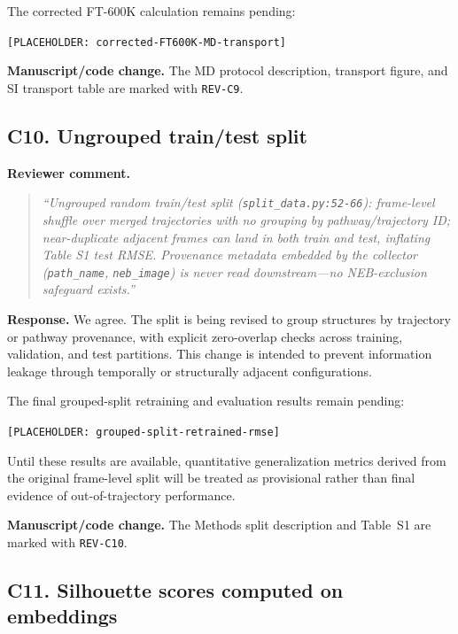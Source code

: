 \documentclass[11pt,a4paper]{article}
\begin{document}
The corrected FT-600K calculation remains pending:

\begin{center}
\texttt{[PLACEHOLDER: corrected-FT600K-MD-transport]}
\end{center}

\noindent\textbf{Manuscript/code change.}
The MD protocol description, transport figure, and SI transport table are marked with \texttt{REV-C9}.

\subsection*{C10. Ungrouped train/test split}

\noindent\textbf{Reviewer comment.}
\begin{quote}
\itshape
``Ungrouped random train/test split (\texttt{split\_data.py:52-66}): frame-level shuffle over merged trajectories with no grouping by pathway/trajectory ID; near-duplicate adjacent frames can land in both train and test, inflating Table S1 test RMSE. Provenance metadata embedded by the collector (\texttt{path\_name}, \texttt{neb\_image}) is never read downstream---no NEB-exclusion safeguard exists.''
\end{quote}

\noindent\textbf{Response.}
We agree. The split is being revised to group structures by trajectory or pathway provenance, with explicit zero-overlap checks across training, validation, and test partitions. This change is intended to prevent information leakage through temporally or structurally adjacent configurations.

The final grouped-split retraining and evaluation results remain pending:

\begin{center}
\texttt{[PLACEHOLDER: grouped-split-retrained-rmse]}
\end{center}

Until these results are available, quantitative generalization metrics derived from the original frame-level split will be treated as provisional rather than final evidence of out-of-trajectory performance.

\noindent\textbf{Manuscript/code change.}
The Methods split description and Table~S1 are marked with \texttt{REV-C10}.

\subsection*{C11. Silhouette scores computed on embeddings}
\end{document}
